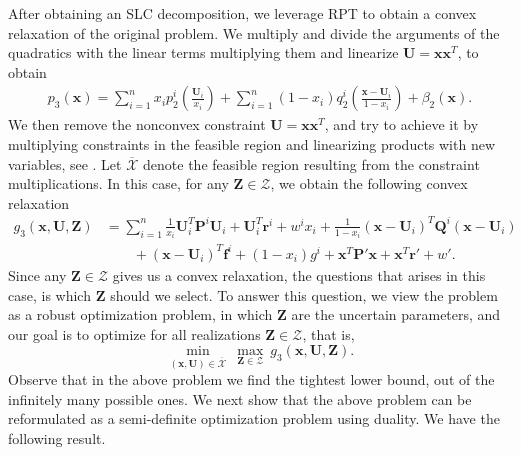 \documentclass[opre,nonblindrev]{informs3} %
\begin{document}
{\color{black} After obtaining an SLC decomposition, we leverage RPT to obtain a convex relaxation of the original problem. We multiply and divide the arguments of the quadratics with the linear terms multiplying them and linearize $\boldsymbol{U} = \boldsymbol{x} \boldsymbol{x}^T$, to obtain  
\begin{align*}
   p_3(\boldsymbol{x}) = \sum_{i=1}^n x_i p_2^i \left( \frac{\boldsymbol{U}_i}{x_i} \right) + \sum_{i=1}^n (1-x_i) q_2^i \left( \frac{\boldsymbol{x}-\boldsymbol{U}_i}{1-x_i} \right) + \beta_2(\boldsymbol{x}). 
\end{align*}  
We then remove the nonconvex constraint $\boldsymbol{U} = \boldsymbol{x} \boldsymbol{x}^T$, and try to achieve it by multiplying constraints in the feasible region and linearizing products with new variables, see \cite{bertsimascone}. Let $\overline{\mathcal{X}}$ denote the feasible region resulting from the constraint multiplications. In this case, for any $\boldsymbol{Z} \in \mathcal{Z}$, we obtain the following convex relaxation 
\begin{align*}
    g_3(\boldsymbol{x},\boldsymbol{U},\boldsymbol{Z}) &= \sum_{i=1}^n \frac{1}{x_i} \boldsymbol{U}_i^T \boldsymbol{P}^i \boldsymbol{U}_i + \boldsymbol{U}_i^T \boldsymbol{r}^i + w^i x_i + \frac{1}{1-x_i} \left( \boldsymbol{x} - \boldsymbol{U}_i \right)^T \boldsymbol{Q}^i \left( \boldsymbol{x} - \boldsymbol{U}_i \right) \\
    &\quad \quad + \left( \boldsymbol{x} - \boldsymbol{U}_i \right)^T \boldsymbol{f}^i + (1-x_i)g^i + \boldsymbol{x}^T \boldsymbol{P}' \boldsymbol{x} + \boldsymbol{x}^T \boldsymbol{r}' + w'.
\end{align*}    
Since any $\boldsymbol{Z} \in \mathcal{Z}$ gives us a convex relaxation, the questions that arises in this case, is which $\boldsymbol{Z}$ should we select. To answer this question, we view the problem as a robust optimization problem, in which $\boldsymbol{Z}$ are the uncertain parameters, and our goal is to optimize for all realizations $\boldsymbol{Z} \in \mathcal{Z}$, that is,
\begin{equation}
       \min_{(\boldsymbol{x},\boldsymbol{U}) \in \overline{\mathcal{X}}} \: \max_{\boldsymbol{Z} \in \mathcal{Z}} \:g_3(\boldsymbol{x},\boldsymbol{U},\boldsymbol{Z}). \label{eq:minmaxproblem_degree3}
\end{equation} 
Observe that in the above problem we find the tightest lower bound, out of the infinitely many possible ones. We next show that the above problem can be reformulated as a semi-definite optimization problem using duality.} We have the following result.
\end{document}
